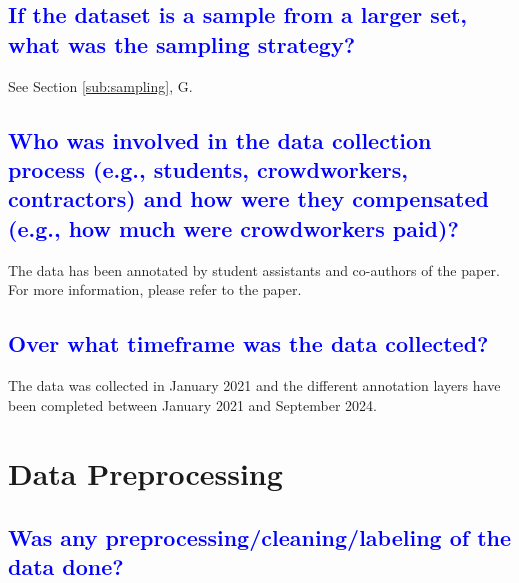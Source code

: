 \documentclass[letterpaper, 10 pt, conference]{ieeeconf}  %
\begin{document}
\textcolor{blue}{\subsection{If the dataset is a sample from a larger set, what was the sampling strategy?}} %


See Section \ref{sub:sampling}, G.



\textcolor{blue}{\subsection{Who was involved in the data collection process (e.g., students, crowdworkers, contractors) and how were they compensated (e.g., how much were crowdworkers paid)?}}

The data has been annotated by student assistants and co-authors of the paper. For  more information, please refer to the paper.





\textcolor{blue}{\subsection{Over what timeframe was the data collected?}} %

The data was collected in January 2021 and the different annotation layers have been completed 
between January 2021 and September 2024.


\vspace{0.8cm}

\section{Data Preprocessing}

\textcolor{blue}{\subsection{Was any preprocessing/cleaning/labeling of the data done?}} 
\end{document}
